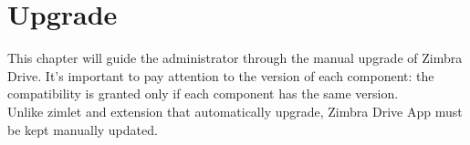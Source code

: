 \chapter{Upgrade}\label{cha:upgrade}
This chapter will guide the administrator through the manual upgrade of Zimbra Drive.
It's important to pay attention to the version of each component: the compatibility is granted 
only if each component has the same version.\\ 
Unlike zimlet and extension that automatically upgrade, Zimbra Drive App must be kept manually updated.




